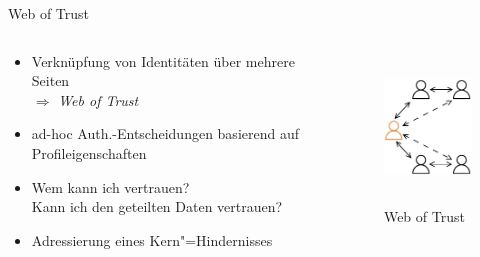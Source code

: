 \begin{frame}{Web of Trust \footnotesize\cite{sambraSolidPlatformDecentralized2016}}
    \begin{columns}
        \begin{column}{0.6\textwidth}
            \begin{itemize}
                \item Verknüpfung von Identitäten über mehrere Seiten\\
                      $\Rightarrow$ \emph{Web of Trust}
                
                \item[$\Rightarrow$]<2-> ad-hoc Auth.-Entscheidungen basierend auf Profileigenschaften
                
                \item[$\Rightarrow$]<3-> Wem kann ich vertrauen?\\ Kann ich den geteilten Daten vertrauen?
                
                \item[$\Rightarrow$]<4-> Adressierung eines Kern"=Hindernisses
            \end{itemize}
        \end{column}

        \begin{column}{0.4\textwidth}
            \vspace{1em}
            \begin{figure}
                \includegraphics[height=4cm]{./assets/web_of_trust.drawio.pdf}
                \caption{Web of Trust}
            \end{figure}
        \end{column}
    \end{columns}
\end{frame}
